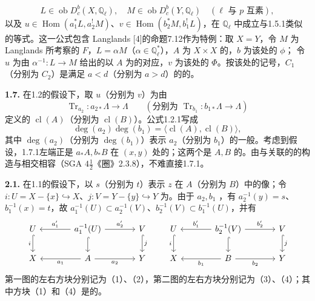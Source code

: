 \[
 L\in\operatorname{ob}D_c^b(X,\mathbb Q_\ell),\quad
 M\in\operatorname{ob}D_c^b(Y,\mathbb Q_\ell)\quad(\ell\text{ 与 }p\text{ 互素}),
\]
以及 $u\in\operatorname{Hom}(a_1^*L,a_2^!M)$、$v\in\operatorname{Hom}(b_2^*M,b_1^!L)$，在 $\mathbb Q_\ell$ 中成立与1.5.1类似的等式。这一公式包含 Langlands [4]的命题7.12作为特例：取 $X=Y$，令 $M$ 为 Langlands 所考察的 $F$，$L=\alpha M$（$\alpha\in\mathbb Q_\ell^*$），$A$ 为 $X\times X$ 的，$b$ 为该处的 $\phi$；
令 $u$ 为由 $\alpha^{-1}:L\to M$ 给出的以 $A$ 为的对应，$v$ 为该处的 $\Phi$。按该处的记号，$C_1$（分别为 $C_2$）是满足 $a<d$（分别为 $a>d$）的的。

\textbf{1.7.} 在1.2的假设下，取 $u$（分别为 $v$）为由
\[
 \operatorname{Tr}_{a_2}:a_{2*}\Lambda\to\Lambda
 \qquad(\text{分别为 }\operatorname{Tr}_{b_1}:b_{1*}\Lambda\to\Lambda)
\]
定义的 $\operatorname{cl}(A)$（分别为 $\operatorname{cl}(B)$）。公式1.2.1写成
\[
 \deg(a_2)\deg(b_1)=\langle\operatorname{cl}(A),\operatorname{cl}(B)\rangle,\tag{1.7.1}
\]
其中 $\deg(a_2)$（分别为 $\deg(b_1)$）表示 $a_2$（分别为 $b_1$）的一般。考虑到假设，1.7.1左端正是 $a_*A,b_*B$ 在 $(x,y)$ 处的；这两个是 $A,B$ 的。由与关联的的构造与相交相容（SGA $4\frac12$《圈》2.3.8），不难直接1.7.1。

\textbf{2.1.} 在1.1的假设下，以 $s$（分别为 $t$）表示 $z$ 在 $A$（分别为 $B$）中的像；令 $i:U=X-\{x\}\hookrightarrow X$、$j:V=Y-\{y\}\hookrightarrow Y$ 为。由于 $a_2,b_1$ ，有 $a_2^{-1}(y)=s$、$b_1^{-1}(x)=t$，故 $a_1^{-1}(U)\subset a_2^{-1}(V)$、$b_2^{-1}(V)\subset b_1^{-1}(U)$，并有
\[
\begin{tikzcd}[column sep=large]
 U\arrow[d,hook,"i"']&a_1^{-1}(U)\arrow[l,"a'_1"']\arrow[r,"a'_2"]\arrow[d,hook]&V\arrow[d,hook,"j"]\\
 X&A\arrow[l,"a_1"]\arrow[r,"a_2"']&Y
\end{tikzcd}
\qquad
\begin{tikzcd}[column sep=large]
 U\arrow[d,hook,"i"']&b_2^{-1}(V)\arrow[l,"b'_1"']\arrow[r,"b'_2"]\arrow[d,hook]&V\arrow[d,hook,"j"]\\
 X&B\arrow[l,"b_1"]\arrow[r,"b_2"']&Y
\end{tikzcd}
\]
第一图的左右方块分别记为（1）、（2），第二图的左右方块分别记为（3）、（4）；其中方块（1）和（4）是的。

